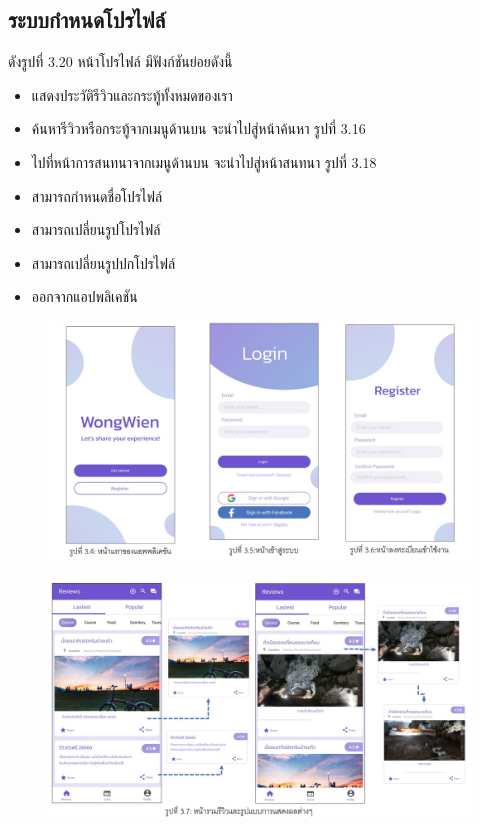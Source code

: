  \subsection{ระบบกำหนดโปรไฟล์ }
 ดังรูปที่ 3.20 หน้าโปรไฟล์ มีฟังก์ชันย่อยดังนี้
 \begin{itemize}
  \item แสดงประวัติรีวิวและกระทู้ทั้งหมดของเรา
  \item ค้นหารีวิวหรือกระทู้จากเมนูด้านบน  จะนำไปสู่หน้าค้นหา รูปที่ 3.16
  \item ไปที่หน้าการสนทนาจากเมนูด้านบน จะนำไปสู่หน้าสนทนา รูปที่ 3.18
  \item สามารถกำหนดชื่อโปรไฟล์
  \item สามารถเปลี่ยนรูปโปรไฟล์
  \item สามารถเปลี่ยนรูปปกโปรไฟล์
  \item ออกจากแอปพลิเคชัน
 \end{itemize}

 

 \begin{figure}
  \begin{center}
    \includegraphics[width=1\textwidth]{./image/reviews/Slide1.JPG}
  \end{center}
  \end{figure}
  
 \begin{figure}
  \begin{center}
    \includegraphics[width=1\textwidth]{./image/reviews/Slide2.JPG}
  \end{center}
  \end{figure}

